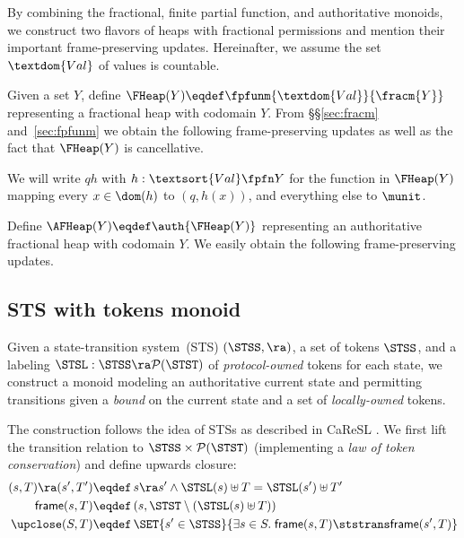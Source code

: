 By combining the fractional, finite partial function, and authoritative monoids, we construct two flavors of heaps with fractional permissions and mention their important frame-preserving updates.
Hereinafter, we assume the set $\textdom{Val}$ of values is countable.

Given a set $Y$, define $\FHeap(Y) \eqdef \fpfunm{\textdom{Val}}{\fracm{Y}}$ representing a fractional heap with codomain $Y$.
From \S\S\ref{sec:fracm} and~\ref{sec:fpfunm} we obtain the following frame-preserving updates as well as the fact that $\FHeap(Y)$ is cancellative.
We will write $qh$ with $h : \textsort{Val} \fpfn Y$ for the function in $\FHeap(Y)$ mapping every $x \in \dom(h)$ to $(q, h(x))$, and everything else to $\munit$.

Define $\AFHeap(Y) \eqdef \auth{\FHeap(Y)}$ representing an authoritative fractional heap with codomain $Y$.
We easily obtain the following frame-preserving updates.

\subsection{STS with tokens monoid}
\label{sec:stsmon}


Given a state-transition system~(STS) $(\STSS, \ra)$, a set of tokens $\STSS$, and a labeling $\STSL: \STSS \ra \mathcal{P}(\STST)$ of \emph{protocol-owned} tokens for each state, we construct a monoid modeling an authoritative current state and permitting transitions given a \emph{bound} on the current state and a set of \emph{locally-owned} tokens.

The construction follows the idea of STSs as described in CaReSL \cite{caresl}.
We first lift the transition relation to $\STSS \times \mathcal{P}(\STST)$ (implementing a \emph{law of token conservation}) and define upwards closure:
\begin{align*}
 (s, T) \ra (s', T') \eqdef&\, s \ra s' \land \STSL(s) \uplus T = \STSL(s') \uplus T' \\
 \textsf{frame}(s, T) \eqdef&\, (s, \STST \setminus (\STSL(s) \uplus T)) \\
 \upclose(S, T) \eqdef&\, \SET{ s' \in \STSS}{\exists s \in S.\; \textsf{frame}(s, T) \ststrans \textsf{frame}(s', T) }
\end{align*}

